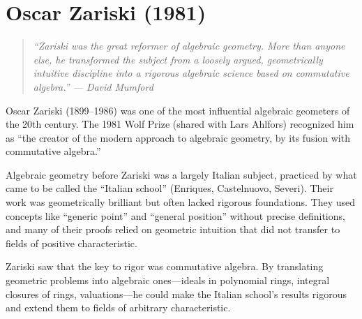\let\Spec\relax
\newcommand{\Spec}{\operatorname{Spec}}
\let\MaxSpec\relax
\newcommand{\MaxSpec}{\operatorname{MaxSpec}}
\let\Proj\relax
\newcommand{\Proj}{\operatorname{Proj}}
\let\im\relax
\newcommand{\im}{\operatorname{im}}
\let\coker\relax
\newcommand{\coker}{\operatorname{coker}}
\let\trdeg\relax
\newcommand{\trdeg}{\operatorname{trdeg}}
\let\cha\relax
\newcommand{\cha}{\operatorname{char}}
\let\Sing\relax
\newcommand{\Sing}{\operatorname{Sing}}
\let\Bl\relax
\newcommand{\Bl}{\operatorname{Bl}}
\let\Pic\relax
\newcommand{\Pic}{\operatorname{Pic}}
\let\Div\relax
\newcommand{\Div}{\operatorname{Div}}
\let\Cl\relax
\newcommand{\Cl}{\operatorname{Cl}}
\let\Gal\relax
\newcommand{\Gal}{\operatorname{Gal}}
\let\N\relax
\newcommand{\N}{\mathbb{N}}
\let\R\relax
\newcommand{\R}{\mathbb{R}}
\let\C\relax
\newcommand{\C}{\mathbb{C}}
\let\Q\relax
\newcommand{\Q}{\mathbb{Q}}
\let\Z\relax
\newcommand{\Z}{\mathbb{Z}}
\let\A\relax
\newcommand{\A}{\mathbb{A}}
\let\cO\relax
\newcommand{\cO}{\mathcal{O}}
\let\cI\relax
\newcommand{\cI}{\mathcal{I}}
\let\cU\relax
\newcommand{\cU}{\mathcal{U}}

\chapter{Oscar Zariski (1981)}

\begin{quote}
\it ``Zariski was the great reformer of algebraic geometry. More than anyone else, he transformed the subject from a loosely argued, geometrically intuitive discipline into a rigorous algebraic science based on commutative algebra.'' --- David Mumford
\end{quote}

Oscar Zariski (1899--1986) was one of the most influential algebraic geometers of the 20th century. The 1981 Wolf Prize (shared with Lars Ahlfors) recognized him as ``the creator of the modern approach to algebraic geometry, by its fusion with commutative algebra.''

Algebraic geometry before Zariski was a largely Italian subject, practiced by what came to be called the ``Italian school'' (Enriques, Castelnuovo, Severi). Their work was geometrically brilliant but often lacked rigorous foundations. They used concepts like ``generic point'' and ``general position'' without precise definitions, and many of their proofs relied on geometric intuition that did not transfer to fields of positive characteristic.

Zariski saw that the key to rigor was commutative algebra. By translating geometric problems into algebraic ones---ideals in polynomial rings, integral closures of rings, valuations---he could make the Italian school's results rigorous and extend them to fields of arbitrary characteristic.

